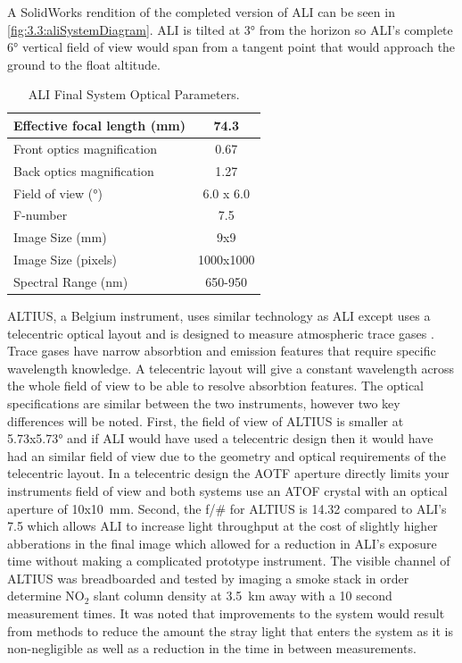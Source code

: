 \documentclass[12pt]{article}
\begin{document}
A SolidWorks rendition of the completed version of ALI can be seen in \autoref{fig:3.3:aliSystemDiagram}. ALI is tilted at 3\si{\degree} from the horizon so ALI's complete 6\si{\degree} vertical field of view would span from a tangent point that would approach the ground to the float altitude.

\begin{table}[!ht]
    \begin{center}
    \begin{tabular}{|l|c|}
      \hline
      Effective focal length (mm) & 74.3 \\
      \hline
      Front optics magnification & 0.67 \\
      \hline
      Back optics magnification & 1.27 \\
      \hline
      Field of view (\si{\degree}) & 6.0 x 6.0 \\
      \hline
      F-number & 7.5 \\
      \hline
      Image Size (mm) & 9x9\\
      \hline
      Image Size (pixels) & 1000x1000\\
      \hline
      Spectral Range (nm) & 650-950\\
      \hline
    \end{tabular}
    \end{center}
    \caption{ALI Final System Optical Parameters.}
    \label{tab:3.2:ALISystemParameters}
\end{table}

ALTIUS, a Belgium instrument, uses similar technology as ALI except uses a telecentric optical layout and is designed to measure atmospheric trace gases \citep{Dekemper2012}. Trace gases have narrow absorbtion and emission features that require specific wavelength knowledge. A telecentric layout will give a constant wavelength across the whole field of view to be able to resolve absorbtion features. The optical specifications are similar between the two instruments, however two key differences will be noted. First, the field of view of ALTIUS is smaller at 5.73x5.73\si{\degree} and if ALI would have used a telecentric design then it would have had an similar field of view due to the geometry and optical requirements of the telecentric layout. In a telecentric design the AOTF aperture directly limits your instruments field of view and both systems use an ATOF crystal with an optical aperture of 10x10~mm. Second, the f/\# for ALTIUS is 14.32 compared to ALI's 7.5 which allows ALI to increase light throughput at the cost of slightly higher abberations in the final image which allowed for a reduction in ALI's exposure time without making a complicated prototype instrument. The visible channel of ALTIUS was breadboarded and tested by imaging a smoke stack in order determine NO$_{2}$ slant column density at 3.5~km away with a 10 second measurement times. It was noted that improvements to the system would result from methods to reduce the amount the stray light that enters the system as it is non-negligible as well as a reduction in the time in between measurements.
\end{document}
